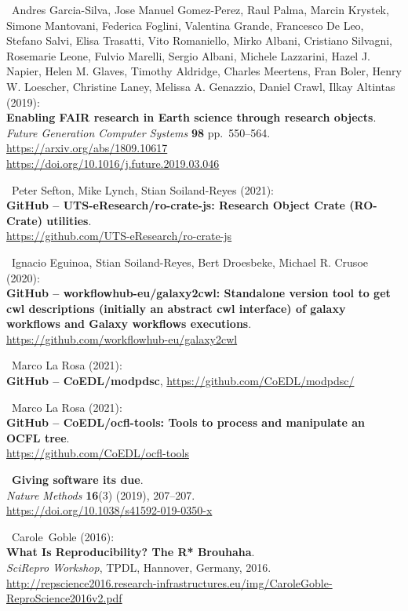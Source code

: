 \begin{thebibliography}{9}
~Andres Garcia-Silva, Jose Manuel Gomez-Perez, Raul Palma,
Marcin Krystek, Simone Mantovani, Federica Foglini, Valentina Grande,
Francesco De Leo, Stefano Salvi, Elisa Trasatti, Vito Romaniello, Mirko
Albani, Cristiano Silvagni, Rosemarie Leone, Fulvio Marelli, Sergio
Albani, Michele Lazzarini, Hazel J. Napier, Helen M. Glaves, Timothy
Aldridge, Charles Meertens, Fran Boler, Henry W. Loescher, Christine
Laney, Melissa A. Genazzio, Daniel Crawl, Ilkay Altintas (2019):\\
\textbf{Enabling FAIR research in Earth science through research
objects}.\\
\emph{Future Generation Computer Systems} \textbf{98} pp.~550--564.\\
\url{https://arxiv.org/abs/1809.10617}~\\
\url{https://doi.org/10.1016/j.future.2019.03.046}

~Peter Sefton, Mike Lynch, Stian Soiland-Reyes (2021):\\
\textbf{GitHub -- UTS-eResearch/ro-crate-js: Research Object Crate
(RO-Crate) utilities}.\\
\url{https://github.com/UTS-eResearch/ro-crate-js}

~Ignacio Eguinoa, Stian Soiland-Reyes, Bert Droesbeke, Michael
R. Crusoe (2020):\\
\textbf{GitHub -- workflowhub-eu/galaxy2cwl: Standalone version tool to
get cwl descriptions (initially an abstract cwl interface) of galaxy
workflows and Galaxy workflows executions}.\\
\url{https://github.com/workflowhub-eu/galaxy2cwl}

~Marco La Rosa (2021):\\
\textbf{GitHub -- CoEDL/modpdsc},
\url{https://github.com/CoEDL/modpdsc/}

~Marco La Rosa (2021):\\
\textbf{GitHub -- CoEDL/ocfl-tools: Tools to process and manipulate an
OCFL tree}.\\
\url{https://github.com/CoEDL/ocfl-tools}

~\textbf{Giving software its due}.\\
\emph{Nature Methods} \textbf{16}(3) (2019), 207--207.\\
\url{https://doi.org/10.1038/s41592-019-0350-x}

~Carole~Goble (2016):\\
\textbf{What Is Reproducibility? The R* Brouhaha}.\\
\emph{SciRepro Workshop}, TPDL, Hannover, Germany, 2016.
\url{http://repscience2016.research-infrastructures.eu/img/CaroleGoble-ReproScience2016v2.pdf}


\end{thebibliography}
